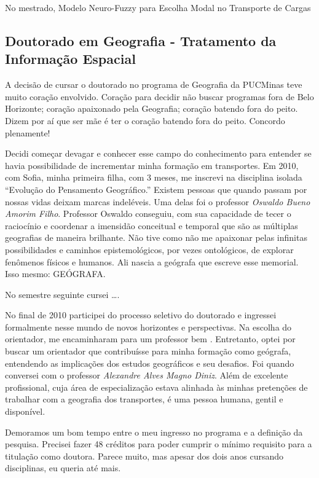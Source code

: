 \documentclass[
]{book}
\begin{document}
No mestrado, Modelo Neuro-Fuzzy para Escolha Modal no Transporte de
Cargas

\hypertarget{doutorado-em-geografia---tratamento-da-informauxe7uxe3o-espacial}{%
\subsection{Doutorado em Geografia - Tratamento da Informação
Espacial}\label{doutorado-em-geografia---tratamento-da-informauxe7uxe3o-espacial}}

A decisão de cursar o doutorado no programa de Geografia da PUCMinas
teve muito coração envolvido. Coração para decidir não buscar programas
fora de Belo Horizonte; coração apaixonado pela Geografia; coração
batendo fora do peito. Dizem por aí que ser mãe é ter o coração batendo
fora do peito. Concordo plenamente!

Decidi começar devagar e conhecer esse campo do conhecimento para
entender se havia possibilidade de incrementar minha formação em
transportes. Em 2010, com Sofia, minha primeira filha, com 3 meses, me
inscrevi na disciplina isolada ``Evolução do Pensamento Geográfico.''
Existem pessoas que quando passam por nossas vidas deixam marcas
indeléveis. Uma delas foi o professor \emph{Oswaldo Bueno Amorim Filho}.
Professor Oswaldo conseguiu, com sua capacidade de tecer o raciocínio e
coordenar a imensidão conceitual e temporal que são as múltiplas
geografias de maneira brilhante. Não tive como não me apaixonar pelas
infinitas possibilidades e caminhos epistemológicos, por vezes
ontológicos, de explorar fenômenos físicos e humanos. Ali nascia a
geógrafa que escreve esse memorial. Isso mesmo: GEÓGRAFA.

No semestre seguinte cursei \ldots.

No final de 2010 participei do processo seletivo do doutorado e
ingressei formalmente nesse mundo de novos horizontes e perspectivas. Na
escolha do orientador, me encaminharam para um professor bem .
Entretanto, optei por buscar um orientador que contribuísse para minha
formação como geógrafa, entendendo as implicações dos estudos
geográficos e seu desafios. Foi quando conversei com o professor
\emph{Alexandre Alves Magno Diniz}. Além de excelente profissional, cuja
área de especialização estava alinhada às minhas pretenções de trabalhar
com a geografia dos transportes, é uma pessoa humana, gentil e
disponível.

Demoramos um bom tempo entre o meu ingresso no programa e a definição da
pesquisa. Precisei fazer 48 créditos para poder cumprir o mínimo
requisito para a titulação como doutora. Parece muito, mas apesar dos
dois anos cursando disciplinas, eu queria até mais.
\end{document}
